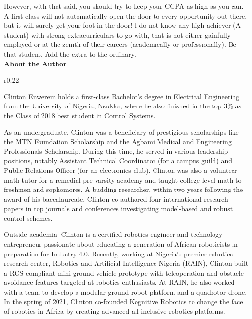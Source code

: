 \documentclass[letter]{article}
\begin{document}
However, with that said, you should try to keep your CGPA as high as you can. A first class will not automatically open the door to every opportunity out there, but it will surely get your foot in the door! I do not know any high-achiever (A-student) with strong extracurriculars to go with, that is not either gainfully employed or at the zenith of their careers (academically or professionally). Be that student. Add the extra to the ordinary.\\

\sffamily
\textbf{About the Author}\\
\vspace{-12px}
\normalfont
\begin{wrapfigure}{r}{0.22\textwidth}
	\begin{center}
		\setlength{\fboxrule}{1.2pt}
		\setlength{\fboxsep}{-1pt}
	\end{center}
\end{wrapfigure}
Clinton Enwerem holds a first-class Bachelor’s degree in Electrical Engineering from the University of Nigeria, Nsukka, where he also finished in the top 3\% as the Class of 2018 best student in Control Systems.

As an undergraduate, Clinton was a beneficiary of prestigious scholarships like the MTN Foundation Scholarship and the Agbami Medical and Engineering Professionals Scholarship. During this time, he served in various leadership positions, notably Assistant Technical Coordinator (for a campus guild) and Public Relations Officer (for an electronics club). Clinton was also a volunteer math tutor for a remedial pre-varsity academy and taught college-level math to freshmen and sophomores. A budding researcher, within two years following the award of his baccalaureate, Clinton co-authored four international research papers in top journals and conferences investigating model-based and robust control schemes.

Outside academia, Clinton is a certified robotics engineer and technology entrepreneur passionate about educating a generation of African roboticists in preparation for Industry 4.0. Recently, working at Nigeria’s premier robotics research center, Robotics and Artificial Intelligence Nigeria (RAIN), Clinton built a ROS-compliant mini ground vehicle prototype with teleoperation and obstacle-avoidance features targeted at robotics enthusiasts. At RAIN, he also worked with a team to develop a modular ground robot platform and a quadrotor drone. In the spring of 2021, Clinton co-founded Kognitive Robotics to change the face of robotics in Africa by creating advanced all-inclusive robotics platforms.
\end{document}

